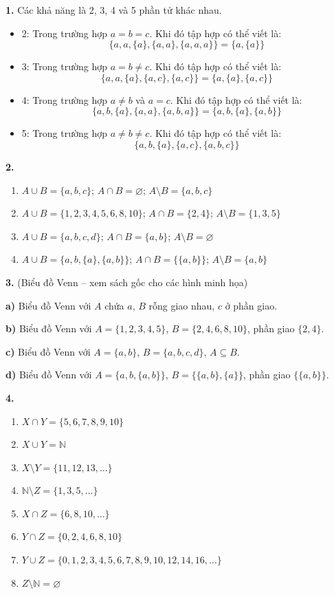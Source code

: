 \documentclass[12pt,a4paper]{article}
\theoremstyle{definition}
\begin{document}
\textbf{1.} Các khả năng là 2, 3, 4 và 5 phần tử khác nhau.
\begin{itemize}
\item 2: Trong trường hợp $a = b = c$. Khi đó tập hợp có thể viết là:
\[\{a, a, \{a\}, \{a, a\}, \{a, a, a\}\} = \{a, \{a\}\}\]
\item 3: Trong trường hợp $a = b \neq c$. Khi đó tập hợp có thể viết là:
\[\{a, a, \{a\}, \{a, c\}, \{a, c\}\} = \{a, \{a\}, \{a, c\}\}\]
\item 4: Trong trường hợp $a \neq b$ và $a = c$. Khi đó tập hợp có thể viết là:
\[\{a, b, \{a\}, \{a, a\}, \{a, b, a\}\} = \{a, b, \{a\}, \{a, b\}\}\]
\item 5: Trong trường hợp $a \neq b \neq c$. Khi đó tập hợp có thể viết là:
\[\{a, b, \{a\}, \{a, c\}, \{a, b, c\}\}\]
\end{itemize}

\bigskip
\textbf{2.}
\begin{enumerate}[label=\textbf{\alph*)}]
\item $A \cup B = \{a, b, c\}$;\; $A \cap B = \varnothing$;\; $A \setminus B = \{a, b, c\}$
\item $A \cup B = \{1, 2, 3, 4, 5, 6, 8, 10\}$;\; $A \cap B = \{2, 4\}$;\; $A \setminus B = \{1, 3, 5\}$
\item $A \cup B = \{a, b, c, d\}$;\; $A \cap B = \{a, b\}$;\; $A \setminus B = \varnothing$
\item $A \cup B = \{a, b, \{a\}, \{a, b\}\}$;\; $A \cap B = \{\{a, b\}\}$;\; $A \setminus B = \{a, b\}$
\end{enumerate}

\bigskip
\textbf{3.} (Biểu đồ Venn -- xem sách gốc cho các hình minh họa)

\textbf{a)} Biểu đồ Venn với $A$ chứa $a$, $B$ rỗng giao nhau, $c$ ở phần giao.

\textbf{b)} Biểu đồ Venn với $A = \{1, 2, 3, 4, 5\}$, $B = \{2, 4, 6, 8, 10\}$, phần giao $\{2, 4\}$.

\textbf{c)} Biểu đồ Venn với $A = \{a, b\}$, $B = \{a, b, c, d\}$, $A \subseteq B$.

\textbf{d)} Biểu đồ Venn với $A = \{a, b, \{a,b\}\}$, $B = \{\{a,b\}, \{a\}\}$, phần giao $\{\{a,b\}\}$.

\bigskip
\textbf{4.}
\begin{enumerate}[label=\textbf{\alph*)}]
\item $X \cap Y = \{5, 6, 7, 8, 9, 10\}$
\item $X \cup Y = \mathbb{N}$
\item $X \setminus Y = \{11, 12, 13, \ldots\}$
\item $\mathbb{N} \setminus Z = \{1, 3, 5, \ldots\}$
\item $X \cap Z = \{6, 8, 10, \ldots\}$
\item $Y \cap Z = \{0, 2, 4, 6, 8, 10\}$
\item $Y \cup Z = \{0, 1, 2, 3, 4, 5, 6, 7, 8, 9, 10, 12, 14, 16, \ldots\}$
\item $Z \setminus \mathbb{N} = \varnothing$
\end{enumerate}
\end{document}
